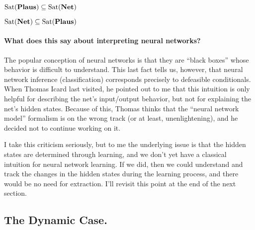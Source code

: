\documentclass[letterpaper]{article}
\begin{document}
\begin{proposition}
    $\mathrm{Sat}( \textrm{\textbf{Plaus}} ) \subseteq \mathrm{Sat}( \textrm{\textbf{Net}} )$
\end{proposition}

\begin{proposition}
    $\mathrm{Sat}( \textrm{\textbf{Net}} ) \subseteq \mathrm{Sat}( \textrm{\textbf{Plaus}} )$
\end{proposition}



\paragraph*{What does this say about interpreting neural networks?}
The popular conception of neural networks is that they are ``black boxes'' whose behavior is difficult to understand.  This last fact tells us, however, that neural network inference (classification) corresponds precisely to defeasible conditionals.  When Thomas Icard last visited, he pointed out to me that this intuition is only helpful for describing the net's input/output behavior, but not for explaining the net's hidden states.  Because of this, Thomas thinks that the ``neural network model'' formalism is on the wrong track (or at least, unenlightening), and he decided not to continue working on it.

I take this criticism seriously, but to me the underlying issue is that the hidden states are determined through learning, and we don't yet have a classical intuition for neural network learning.  If we did, then we could understand and track the changes in the hidden states during the learning process, and there would be no need for extraction.  I'll revisit this point at the end of the next section.

\subsection*{The Dynamic Case.}
\end{document}
